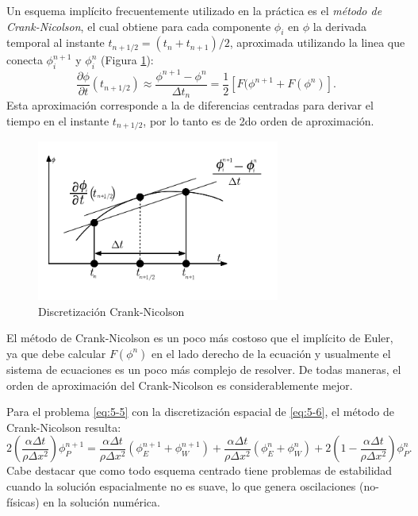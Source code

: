 \documentclass[a4paper,10pt, oneside]{book}
\begin{document}
Un esquema implícito frecuentemente utilizado en la práctica es el \textit{método de Crank-Nicolson}, el cual obtiene para cada componente $\phi_i$ en $\phi$ la derivada temporal al instante $t_{n+1/2} = (t_n + t_{n+1})/2$, aproximada utilizando la linea que conecta $\phi_i^{n+1}$ y $\phi_i^n$ (Figura \ref{img:5-9}):
\begin{equation}
	\frac{\partial \phi}{\partial t}(t_{n+1/2}) \approx \frac{\phi^{n+1} -\phi^n}{\Delta t_n} = \frac12 \left[ F(\phi^{n+1} + F(\phi^n) \right]. \nonumber
\end{equation} 
Esta aproximación corresponde a la de diferencias centradas para derivar el tiempo en el instante $t_{n+1/2}$, por lo tanto es de 2do orden de aproximación. 
\begin{figure}[h!]
	\centering
	\includegraphics[width=8cm]{Img/5-9}
	\caption{Discretización Crank-Nicolson}
	\label{img:5-9}
\end{figure}

El método de Crank-Nicolson es un poco más costoso que el implícito de Euler, ya que debe calcular $F(\phi^n)$ en el lado derecho de la ecuación y usualmente el sistema de ecuaciones es un poco más complejo de resolver. De todas maneras, el orden de aproximación del Crank-Nicolson es considerablemente mejor.

Para el problema \ref{eq:5-5} con la discretización espacial de \ref{eq:5-6}, el método de Crank-Nicolson resulta:
\begin{equation}
	2 \left( \frac{\alpha \Delta t}{\rho \Delta x^2} \right) \phi_P^{n+1} =  \frac{\alpha \Delta t}{\rho \Delta x^2} \left( \phi_E^{n+1} + \phi_W^{n+1} \right) + \frac{\alpha \Delta t}{\rho \Delta x^2} \left( \phi_E^n + \phi_W^n \right) + 2 \left( 1 - \frac{\alpha \Delta t}{\rho \Delta x^2} \right) \phi_P^n. \nonumber
\end{equation}
Cabe destacar que como todo esquema centrado tiene problemas de estabilidad cuando la solución espacialmente no es suave, lo que genera oscilaciones (no-físicas) en la solución numérica.
\end{document}
